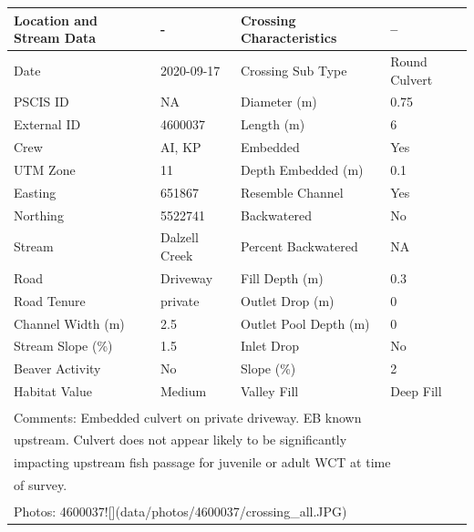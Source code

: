 \documentclass[
]{book}
\begin{document}
\begin{tabular}{l|l|l|l}
\hline
Location and Stream Data & - & Crossing Characteristics & --\\
\hline
Date & 2020-09-17 & Crossing Sub Type & Round Culvert\\
\hline
PSCIS ID & NA & Diameter (m) & 0.75\\
\hline
External ID & 4600037 & Length (m) & 6\\
\hline
Crew & AI, KP & Embedded & Yes\\
\hline
UTM Zone & 11 & Depth Embedded (m) & 0.1\\
\hline
Easting & 651867 & Resemble Channel & Yes\\
\hline
Northing & 5522741 & Backwatered & No\\
\hline
Stream & Dalzell Creek & Percent Backwatered & NA\\
\hline
Road & Driveway & Fill Depth (m) & 0.3\\
\hline
Road Tenure & private & Outlet Drop (m) & 0\\
\hline
Channel Width (m) & 2.5 & Outlet Pool Depth (m) & 0\\
\hline
Stream Slope (\%) & 1.5 & Inlet Drop & No\\
\hline
Beaver Activity & No & Slope (\%) & 2\\
\hline
Habitat Value & Medium & Valley Fill & Deep Fill\\
\hline
\multicolumn{4}{l}{\textsuperscript{} Comments: Embedded culvert on private driveway. EB known}\\
\multicolumn{4}{l}{upstream. Culvert does not appear likely to be significantly}\\
\multicolumn{4}{l}{impacting upstream fish passage for juvenile or adult WCT at time}\\
\multicolumn{4}{l}{of survey.}\\
\multicolumn{4}{l}{\textsuperscript{} Photos: 4600037![](data/photos/4600037/crossing\_all.JPG)}\\
\end{tabular}
\end{document}

